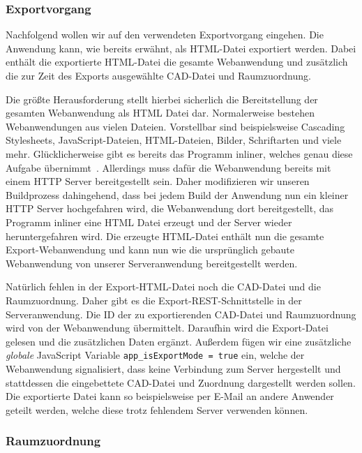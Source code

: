 \subsubsection{Exportvorgang}
\label{subsubsec:export-process}

Nachfolgend wollen wir auf den verwendeten Exportvorgang eingehen.
Die Anwendung kann, wie bereits erwähnt, als HTML-Datei exportiert werden.
Dabei enthält die exportierte HTML-Datei die gesamte Webanwendung und zusätzlich die zur Zeit des Exports ausgewählte CAD-Datei und Raumzuordnung.

Die größte Herausforderung stellt hierbei sicherlich die Bereitstellung der gesamten Webanwendung als HTML Datei dar.
Normalerweise bestehen Webanwendungen aus vielen Dateien.
Vorstellbar sind beispielsweise Cascading Stylesheets, JavaScript-Dateien, HTML-Dateien, Bilder, Schriftarten und viele mehr.
Glücklicherweise gibt es bereits das Programm \glqq{}inliner\grqq{}, welches genau diese Aufgabe übernimmt~\cite{Inliner}.
Allerdings muss dafür die Webanwendung bereits mit einem HTTP Server bereitgestellt sein.
Daher modifizieren wir unseren Buildprozess dahingehend, dass bei jedem Build der Anwendung nun ein kleiner HTTP Server hochgefahren wird, die Webanwendung dort bereitgestellt, das Programm \glqq{}inliner\grqq{} eine HTML Datei erzeugt und der Server wieder heruntergefahren wird.
Die erzeugte HTML-Datei enthält nun die gesamte Export-Webanwendung und kann nun wie die ursprünglich gebaute Webanwendung von unserer Serveranwendung bereitgestellt werden.

Natürlich fehlen in der Export-HTML-Datei noch die CAD-Datei und die Raumzuordnung.
Daher gibt es die Export-REST-Schnittstelle in der Serveranwendung.
Die ID der zu exportierenden CAD-Datei und Raumzuordnung wird von der Webanwendung übermittelt.
Daraufhin wird die Export-Datei gelesen und die zusätzlichen Daten ergänzt.
Außerdem fügen wir eine zusätzliche \textit{globale} JavaScript Variable \texttt{app\_isExportMode = true} ein, welche der Webanwendung signalisiert, dass keine Verbindung zum Server hergestellt und stattdessen die eingebettete CAD-Datei und Zuordnung dargestellt werden sollen.
Die exportierte Datei kann so beispielsweise per E-Mail an andere Anwender geteilt werden, welche diese trotz fehlendem Server verwenden können.

\subsubsection{Raumzuordnung}
\label{subsubsec:room-mapping}

